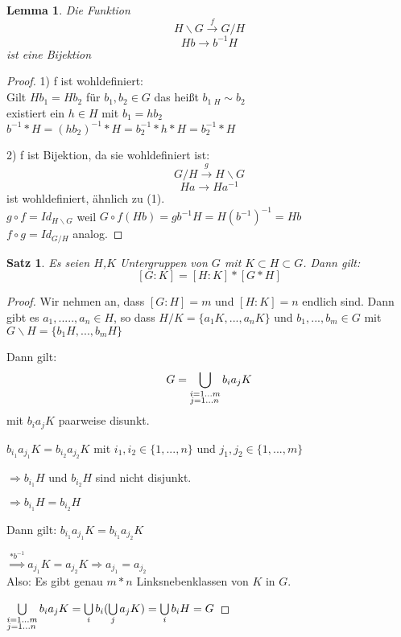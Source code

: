 \documentclass[12pt]{scrartcl}%
\newtheorem{thm}{Satz}
\newtheorem{lemma}{Lemma}
\theoremstyle{definition}
\theoremstyle{remark}
\begin{document}
\newpage
\thispagestyle{empty}

\begin{lemma} 
Die Funktion
$$  	H\backslash G   \xrightarrow{f} G/H $$
$$	Hb \rightarrow b^{-1}H$$
ist eine Bijektion

\end{lemma}

\begin{proof}
1) f ist wohldefiniert:\\
Gilt $Hb_{1}=Hb_{2}$ für $b_{1},b_{2} \in G$
das heißt $b_{1} {_{\ H}}\sim b_{2}$ \\
existiert ein $h \in H$ mit $b_1 = hb_2$ \\
$b^{-1}*H = (hb_2)^{-1}*H = b_{2}^{-1}*h*H =  b_{2}^{-1}*H$ 

2) f ist Bijektion, da sie wohldefiniert ist:\\
$$  	G/H   \xrightarrow{g} H\backslash G $$
$$	Ha \rightarrow Ha^{-1}$$
ist wohldefiniert, ähnlich zu (1).\\
$g \circ f = Id_{H \backslash G}$ weil $G \circ f(Hb) = gb^{-1}H=H(b^{-1})^{-1}=Hb$ \\
$f \circ g = Id_{G \slash H}$ analog.
\end{proof}

\begin{thm}
Es seien $H$,$K$ Untergruppen von $G$ mit $K \subset H \subset G$. Dann gilt: $$[G:K]=[H:K]*[G*H]$$
\end{thm}

\begin{proof}
Wir nehmen an, dass $[G:H]=m$ und $[H:K]=n$ endlich sind. 
Dann gibt es $a_1,.....,a_n \in H$, so dass
$H/K=\{ a_1K,...,a_nK\}$ und $b_1,...,b_m \in G$ mit
$G\backslash H=\{ b_1H,...,b_mH\}$

Dann gilt:
$$G=\bigcup\limits_{\begin{subarray}{1}i=1...m \\ j=1...n\end{subarray}} b_ia_jK$$
mit $b_ia_jK$ paarweise disunkt.

$b_{i_{1}}a_{j_{1}}K=b_{i_{2}}a_{j_{2}}K$ mit $i_1,i_2 \in \{1,...,n \}$ und $j_1,j_2 \in \{1,...,m \}$

$\Rightarrow b_{i_{1}}H$ und $b_{i_{2}}H$ sind nicht disjunkt.

$\Rightarrow b_{i_{1}}H=b_{i_{2}}H$

Dann gilt: $b_{i_{1}}a_{j_{1}}K=b_{i_{1}}a_{j_{2}}K$

$\overset{*b^{-1}}{\Rightarrow} a_{j_{1}}K=a_{j_{2}}K \Rightarrow a_{j_{1}}=a_{j_{2}}$ \\
Also: Es gibt genau $m*n$ Linksnebenklassen von $K$ in $G$.

$\bigcup\limits_{\begin{subarray}{1}i=1...m \\ j=1...n\end{subarray}} b_ia_jK =  \bigcup\limits_i b_i( \bigcup\limits_j a_jK)= \bigcup\limits_i b_iH=G$

\end{proof}
\end{document}
